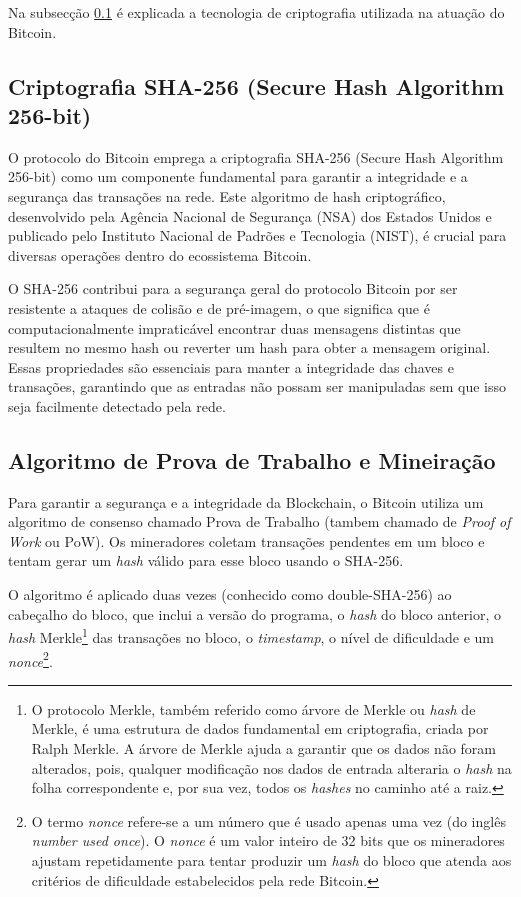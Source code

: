 Na subsecção \ref*{subsec:sha256} é explicada a tecnologia de criptografia utilizada na atuação do Bitcoin.

\subsection{Criptografia SHA-256 (Secure Hash Algorithm 256-bit)} \label{subsec:sha256}
O protocolo do Bitcoin emprega a criptografia SHA-256 (Secure Hash Algorithm 256-bit) como um componente fundamental para garantir a integridade e a segurança das transações na rede. Este algoritmo de hash criptográfico, desenvolvido pela Agência Nacional de Segurança (NSA) dos Estados Unidos e publicado pelo Instituto Nacional de Padrões e Tecnologia (NIST), é crucial para diversas operações dentro do ecossistema Bitcoin. 

O SHA-256 contribui para a segurança geral do protocolo Bitcoin por ser resistente a ataques de colisão e de pré-imagem, o que significa que é computacionalmente impraticável encontrar duas mensagens distintas que resultem no mesmo hash ou reverter um hash para obter a mensagem original. Essas propriedades são essenciais para manter a integridade das chaves e transações, garantindo que as entradas não possam ser manipuladas sem que isso seja facilmente detectado pela rede.

\subsection{Algoritmo de Prova de Trabalho e Mineiração} \label{subsec:pow}
Para garantir a segurança e a integridade da Blockchain, o Bitcoin utiliza um algoritmo de consenso chamado Prova de Trabalho (tambem chamado de \textit{Proof of Work} ou PoW). Os mineradores coletam transações pendentes em um bloco e tentam gerar um \textit{hash} válido para esse bloco usando o SHA-256. 

O algoritmo é aplicado duas vezes (conhecido como double-SHA-256) ao cabeçalho do bloco, que inclui a versão do programa, o \textit{hash} do bloco anterior, o \textit{hash} Merkle\footnote{O protocolo Merkle, também referido como árvore de Merkle ou \textit{hash} de Merkle, é uma estrutura de dados fundamental em criptografia, criada por Ralph Merkle. A árvore de Merkle ajuda a garantir que os dados não foram alterados, pois, qualquer modificação nos dados de entrada alteraria o \textit{hash} na folha correspondente e, por sua vez, todos os \textit{hashes} no caminho até a raiz.}  das transações no bloco, o \textit{timestamp}, o nível de dificuldade e um \textit{nonce}\footnote{O termo \textit{nonce} refere-se a um número que é usado apenas uma vez (do inglês \textit{number used once}). O \textit{nonce} é um valor inteiro de 32 bits que os mineradores ajustam repetidamente para tentar produzir um \textit{hash} do bloco que atenda aos critérios de dificuldade estabelecidos pela rede Bitcoin.}.

